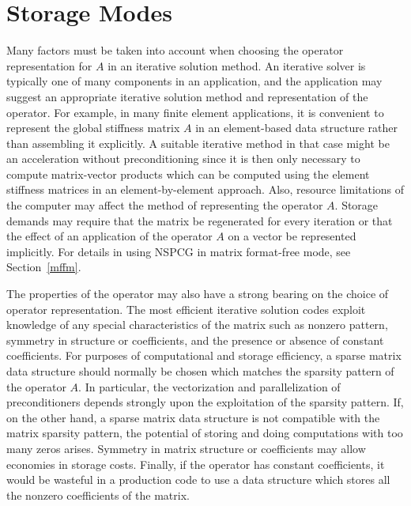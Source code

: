 \clearpage
\section{Storage Modes}
\label{storage}
\indent
 
Many factors must be taken into account when choosing the operator 
representation for $A$ in an iterative solution method.  An iterative 
solver is typically one of many components in an application, and 
the application may suggest an appropriate iterative solution method 
and representation of the operator.  For example, in many finite 
element applications, it is convenient to represent the global stiffness 
matrix $A$ in an element-based data structure rather than
assembling it explicitly.  A suitable iterative method in that case
might be an acceleration without preconditioning since it is then
only necessary to compute matrix-vector products which can be computed
using the element stiffness matrices in an element-by-element approach.  
Also, resource limitations of the computer may affect the method of 
representing the operator $A$.  Storage demands may require that 
the matrix be regenerated for every iteration or that the effect 
of an application of the operator $A$ on a vector be represented 
implicitly.  For details in using NSPCG in matrix format-free
mode, see Section~\ref{mffm}. 

The properties of the operator may also have a strong bearing 
on the choice of operator representation. The most efficient 
iterative solution codes exploit knowledge of any special 
characteristics of the matrix such as nonzero pattern, symmetry 
in structure or coefficients, and the presence or absence of constant
coefficients.  For purposes of computational and storage
efficiency, a sparse matrix data structure should normally 
be chosen which matches the sparsity pattern of the operator 
$A$.  In particular, the vectorization and parallelization of
preconditioners depends strongly upon the exploitation of
the sparsity pattern.  If, on the other hand, a sparse 
matrix data structure is not compatible with the matrix sparsity 
pattern, the potential of storing and doing computations 
with too many zeros arises.  Symmetry in matrix structure or 
coefficients may allow economies in storage costs.  Finally, 
if the operator has constant coefficients, it would be wasteful 
in a production code to use a data structure which stores all 
the nonzero coefficients of the matrix. 

